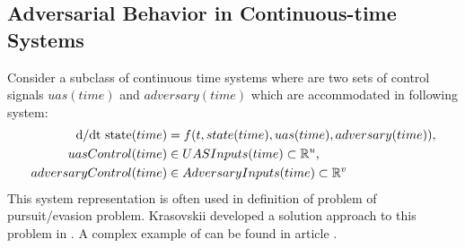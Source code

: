 \subsection{Adversarial Behavior in Continuous-time Systems}
\noindent Consider a subclass of continuous time systems where are two sets of control signals $uas(time)$ and $adversary(time)$ which are accommodated in following system:
\begin{equation}\label{eq:Adversarial}
    \begin{aligned}
    \text{d} / \text{d} \text{t state}(time)&= f(t,state(time),uas(time),adversary(time)), \\
    uasControl(time) &\in UAS Inputs(time) \subset \mathbb{R}^u, \\
    adversaryControl(time) &\in Adversary Inputs(time) \subset \mathbb{R}^v \\
    \end{aligned}
\end{equation}
This system representation is often used in definition of problem of pursuit/evasion problem. Krasovskii developed a solution approach to this problem in \cite{game1987}. A complex example of can be found in article \cite{game1988}.